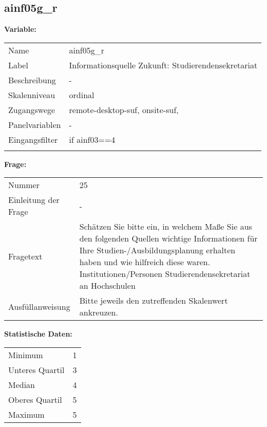 	
	
	\subsection{ainf05g\_r}
	\label{subSection:ainf05g_r}

	\noindent\textbf{Variable:}\\
		\begin{tabular}{lL{11.3cm}}
			\label{tableVariable:ainf05g_r}
			Name & ainf05g\_r \\
			Label & Informationsquelle Zukunft: Studierendensekretariat \\
			Beschreibung & - \\
			Skalenniveau & ordinal \\
			Zugangswege &
				remote-desktop-suf,
				onsite-suf,
 \\
			Panelvariablen & -
			 \\
			Eingangsfilter & if ainf03==4 \\
 \\
		\end{tabular}

		\vspace*{1 cm}
		\noindent\textbf{Frage:}\\
		\begin{tabular}{lL{11.3cm}}
			\label{tableQuestion:ainf05g_r}
			Nummer & 25 \\
			Einleitung der Frage & - \\
			Fragetext & Schätzen Sie bitte ein, in welchem Maße Sie aus den folgenden Quellen wichtige Informationen für Ihre Studien-/Ausbildungsplanung erhalten haben und wie hilfreich diese waren.
Institutionen/Personen
Studierendensekretariat an Hochschulen \\
			Ausfüllanweisung & Bitte jeweils den zutreffenden Skalenwert ankreuzen. \\
		\end{tabular}


		\vspace*{1 cm}
		\noindent\textbf{Statistische Daten:}\\
			\begin{tabular}{ll}
				\label{tableStatistics:ainf05g_r}
					Minimum & 1 \\
					Unteres Quartil & 3 \\
					Median & 4 \\
					Oberes Quartil & 5 \\
					Maximum & 5 \\
			\end{tabular}



